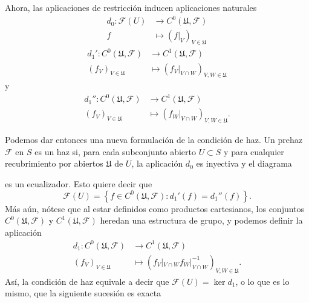 \documentclass[12pt,a4paper]{article}
\theoremstyle{definition} \newtheorem{defn}[thm]{Definición}
\theoremstyle{definition} \newtheorem{ejemplo}[thm]{Ejemplo}
\theoremstyle{definition} \newtheorem{ejercicio}[thm]{Ejercicio}
\def\FF{\mathscr{F}}
\def\UU{\mathfrak{U}}
\begin{document}
  Ahora, las aplicaciones de restricción inducen aplicaciones naturales
  \begin{align*}
    d_0 :\FF(U)&\longrightarrow C^0(\UU,\FF)\\ 
    f &\longmapsto (f|_V)_{V\in \UU}
    \end{align*}
    \begin{align*}
      d_1' :C^0(\UU,\FF)&\longrightarrow C^1(\UU,\FF)\\ 
      (f_V)_{V\in \UU} &\longmapsto (f_V|_{V\cap W})_{V,W \in \UU}
      \end{align*}
      y
    \begin{align*}
      d_1'' :C^0(\UU,\FF)&\longrightarrow C^1(\UU,\FF)\\ 
      (f_V)_{V\in \UU} &\longmapsto (f_W|_{V\cap W})_{V,W \in \UU}.
      \end{align*}

  Podemos dar entonces una nueva formulación de la condición de haz. Un prehaz $\FF$ en $S$ es un haz si, para cada subconjunto abierto $U\subset S$ y para cualquier recubrimiento por abiertos $\UU$ de $U$, la aplicación $d_0$ es inyectiva y el diagrama
  \begin{center}
  \end{center}
  es un ecualizador. Esto quiere decir que
  \begin{equation*}
    \FF(U)=\left\{ f\in C^0(\UU,\FF) : d_1'(f) = d_1''(f) \right\}.
  \end{equation*}
  Más aún, nótese que al estar definidos como productos cartesianos, los conjuntos $C^0(\UU,\FF)$ y $C^1(\UU,\FF)$ heredan una estructura de grupo, y podemos definir la aplicación
  \begin{align*}
    d_1 :C^0(\UU,\FF)&\longrightarrow C^1(\UU,\FF)\\ 
    (f_V)_{V\in \UU} &\longmapsto (f_V|_{V\cap W} f_W|_{V\cap W}^{-1})_{V,W \in \UU}. 
    \end{align*}
    Así, la condición de haz equivale a decir que $\FF(U)= \ker d_1$, o lo que es lo mismo, que la siguiente sucesión es exacta
    \begin{center}
    \end{center}
\end{document}
